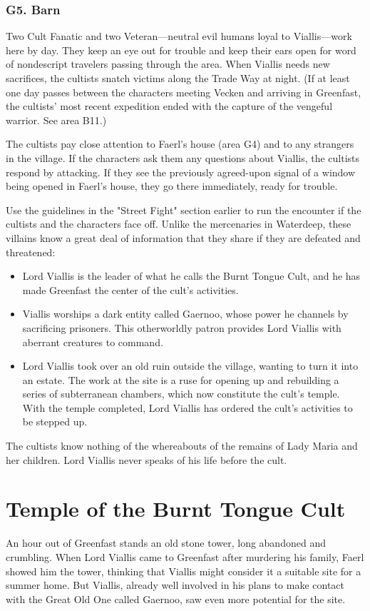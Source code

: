 \documentclass[10pt,a4paper,twoside,bg=print,twocolumn,openany,nodeprecatedcode]{dndbook}
\begin{document}
\subsubsection{G5. Barn}
Two Cult Fanatic and two Veteran—neutral evil humans loyal to Viallis—work here by day. They keep an eye out for trouble and keep their ears open for word of nondescript travelers passing through the area. When Viallis needs new sacrifices, the cultists snatch victims along the Trade Way at night. (If at least one day passes between the characters meeting Vecken and arriving in Greenfast, the cultists' most recent expedition ended with the capture of the vengeful warrior. See area B11.)

The cultists pay close attention to Faerl's house (area G4) and to any strangers in the village. If the characters ask them any questions about Viallis, the cultists respond by attacking. If they see the previously agreed-upon signal of a window being opened in Faerl's house, they go there immediately, ready for trouble.

Use the guidelines in the "Street Fight" section earlier to run the encounter if the cultists and the characters face off. Unlike the mercenaries in Waterdeep, these villains know a great deal of information that they share if they are defeated and threatened:


\begin{itemize}
\item Lord Viallis is the leader of what he calls the Burnt Tongue Cult, and he has made Greenfast the center of the cult's activities.
\item Viallis worships a dark entity called Gaernoo, whose power he channels by sacrificing prisoners. This otherworldly patron provides Lord Viallis with aberrant creatures to command.
\item Lord Viallis took over an old ruin outside the village, wanting to turn it into an estate. The work at the site is a ruse for opening up and rebuilding a series of subterranean chambers, which now constitute the cult's temple. With the temple completed, Lord Viallis has ordered the cult's activities to be stepped up.
\end{itemize}

The cultists know nothing of the whereabouts of the remains of Lady Maria and her children. Lord Viallis never speaks of his life before the cult.

\section{Temple of the Burnt Tongue Cult}
An hour out of Greenfast stands an old stone tower, long abandoned and crumbling. When Lord Viallis came to Greenfast after murdering his family, Faerl showed him the tower, thinking that Viallis might consider it a suitable site for a summer home. But Viallis, already well involved in his plans to make contact with the Great Old One called Gaernoo, saw even more potential for the site.
\end{document}
